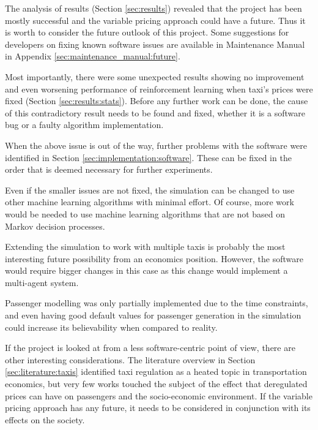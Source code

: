The analysis of results (Section \ref{sec:results}) revealed that the project
has been mostly successful and the variable pricing approach could have a
future. Thus it is worth to consider the future outlook of this project. Some
suggestions for developers on fixing known software issues are available in
Maintenance Manual in Appendix \ref{sec:maintenance_manual:future}.

Most importantly, there were some unexpected results showing no improvement and
even worsening performance of reinforcement learning when taxi's prices were
fixed (Section \ref{sec:results:stats}). Before any further work can be done,
the cause of this contradictory result needs to be found and fixed, whether it
is a software bug or a faulty algorithm implementation.

When the above issue is out of the way, further problems with the software were
identified in Section \ref{sec:implementation:software}. These can be fixed in
the order that is deemed necessary for further experiments. 

Even if the smaller issues are not fixed, the simulation can be changed to use
other machine learning algorithms with minimal effort. Of course, more work
would be needed to use machine learning algorithms that are not based on Markov
decision processes.

Extending the simulation to work with multiple taxis is probably the most
interesting future possibility from an economics position. However, the
software would require bigger changes in this case as this change would
implement a multi-agent system.

Passenger modelling was only partially implemented due to the time constraints,
and even having good default values for passenger generation in the simulation
could increase its believability when compared to reality.

If the project is looked at from a less software-centric point of view, there
are other interesting considerations. The literature overview in Section
\ref{sec:literature:taxis} identified taxi regulation as a heated topic in
transportation economics, but very few works touched the subject of the effect
that deregulated prices can have on passengers and the socio-economic
environment. If the variable pricing approach has any future, it needs to be
considered in conjunction with its effects on the society.
